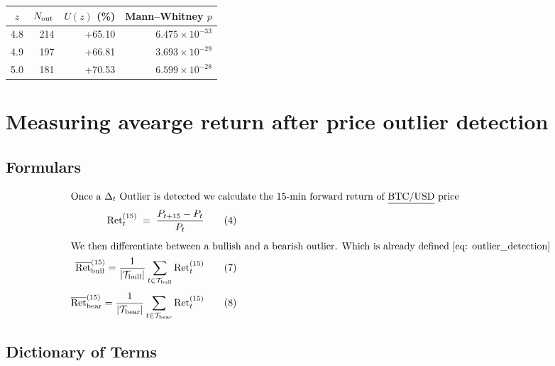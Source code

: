 \documentclass[12pt]{article}
\begin{document}
\begin{table}[H]
  \centering
  
  \label{tap:top3-z-out-of-sample}
  \begin{tabular}{@{} c  r  r  r @{}}  
    \toprule
    $z$ & $N_{\rm out}$ & $U(z)$ (\%) & Mann–Whitney $p$ \\  
  \midrule
  4.8 & 214 & +65.10 & $6.475\times10^{-33}$ \\  
  4.9 & 197 & +66.81 & $3.693\times10^{-29}$ \\  
  5.0 & 181 & +70.53 & $6.599\times10^{-28}$ \\ 
\bottomrule
\end{tabular}

\end{table}












\newpage
\section{Measuring avearge return after price outlier detection}




\subsection{Formulars}
\begin{align}
\intertext{Once a $\Delta_t$ Outlier is detected we calculate the 15-min forward return of \underline{BTC/USD} price}
\mathrm{Ret}^{(15)}_t
\;=\;\frac{P_{t+15} - P_t}{P_t}
\tag{4}\\[1ex]
\intertext{We then differentiate between a bullish and a bearish outlier. Which is already defined \eqref{eq: outlier_detection}}
\overline{\mathrm{Ret}}^{(15)}_{\rm bull}
= \frac{1}{|\mathcal{T}_{\rm bull}|}
  \sum_{t\in\mathcal{T}_{\rm bull}} \mathrm{Ret}^{(15)}_t
\tag{7}\\[1ex]
\overline{\mathrm{Ret}}^{(15)}_{\rm bear}
= \frac{1}{|\mathcal{T}_{\rm bear}|}
  \sum_{t\in\mathcal{T}_{\rm bear}} \mathrm{Ret}^{(15)}_t
\tag{8}
\end{align}







\subsection{Dictionary of Terms}
\end{document}

